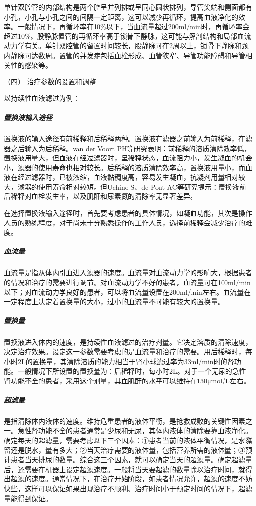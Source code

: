 单针双腔管的内部结构是两个腔呈并列排或呈同心圆状排列，导管尖端和侧面都有小孔，小孔与小孔之间的间隔一定距离，这可以减少再循环，提高血液净化的效率。一般情况下，再循环率在10\%以下，当血流量超过200ml/min时，再循环率会超过10\%。股静脉置管的再循环率高于锁骨下静脉，这可能与解剖结构和局部血流动力学有关。单针双腔管的留置时间较长，股静脉可在2周以上，锁骨下静脉和颈内静脉可达数周。置管的并发症包括血栓形成、血管狭窄、导管功能障碍和导管相关性的感染等。

\hypertarget{text00391.htmlux5cux23CHP16-10-2-3-4}{}
（四） 治疗参数的设置和调整

以持续性血液滤过为例：

\subparagraph{置换液输入途径}

置换液的输入途径有前稀释和后稀释两种。置换液在滤器之前输入为前稀释，在滤器之后输入为后稀释。van
der Voort
PH等研究表明：前稀释的溶质清除效率低，置换液用量大，但血液在经过滤器时，呈稀释状态，血流阻力小，发生凝血的机会小，滤器的使用寿命也相对较长。后稀释的溶质清除效率高，置换液用量小，而血液在经过滤器时，已被浓缩，血液黏稠度高，容易发生凝血，抗凝剂用量相对较大，滤器的使用寿命相对较短。但Uchino
S、de Pont
AC等研究提示：置换液前后稀释对血栓发生率，以及肌酐和尿素氮的清除率无显著差异。

在选择置换液输入途径时，首先要考虑患者的具体情况，如凝血功能，其次是操作人员的熟练程度，对于尚未十分熟悉操作的工作人员，选择前稀释会减少治疗的难度。

\subparagraph{血流量}

血流量是指从体内引血进入滤器的速度。血流量对血流动力学的影响大，根据患者的情况和治疗的需要进行调节。对血流动力学不好的患者，血流量可在100ml/min以下；对血流动力学良好的患者，可以将血流量设置在200ml/min左右。血流量在一定程度上决定着置换量的大小，过小的血流量不可能有较大的置换量。

\subparagraph{置换量}

置换液进入体内的速度，是持续性血液滤过的治疗剂量。它决定溶质的清除速度，决定治疗效果。设定这一参数需要考虑的是血流量和治疗的需要。用后稀释时，每小时2L的置换量，其清除溶质的能力相当于肾小球滤过率为33ml/min时的肾功能。一般情况下所设置的置换量为：后稀释时，每小时2L。对于一个无尿的急性肾功能不全的患者，采用这个剂量，其血肌酐的水平可以维持在130μmol/L左右。

\subparagraph{超滤量}

是指清除体内液体的速度。维持危重患者的液体平衡，是抢救成败的关键性因素之一。急性肾功能不全的患者通常是少尿和无尿，其体内液体的清除要靠血液净化。确定每天的超滤量，需要考虑以下三个因素：①患者当前的液体平衡情况，是水潴留还是脱水，量有多大；②当天治疗需要的液体量，包括营养所需的液体量；③预计患者当天排尿的数量。综合这三个因素，就可以确定当天的超滤量。确定超滤量后，还需要在机器上设定超滤速度。一般将当天要超滤的数量除以治疗时间，就得出超滤的速度。通常情况下，在治疗开始阶段，如患者情况允许，超滤的速度不妨快些，这样可以保证如果出现治疗不顺利、治疗时间小于预定时间的情况下，超滤量能得到保证。

